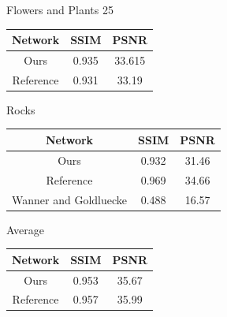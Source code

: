 \documentclass[10pt,twocolumn,letterpaper]{article}
\begin{document}
\begin{center}
Flowers and Plants 25

\begin{tabular}{|c c c|}
    \hline
    Network & SSIM & PSNR \\ \hline
    Ours & 0.935 & 33.615 \\
    Reference & 0.931 & 33.19 \\ 
    \hline
\end{tabular}
\end{center}
            
\begin{center}
Rocks

\begin{tabular}{|c c c|}
    \hline
    Network & SSIM & PSNR \\ \hline
    Ours & 0.932 & 31.46 \\
    Reference & 0.969 & 34.66 \\ 
    Wanner and Goldluecke & 0.488 & 16.57 \\
    \hline
\end{tabular}
\end{center}

\begin{center}
Average

\begin{tabular}{|c c c|}
    \hline
    Network & SSIM & PSNR \\ \hline
    Ours & 0.953 & 35.67 \\
    Reference & 0.957 & 35.99 \\ 
    \hline
\end{tabular}
\end{center}
\end{document}
